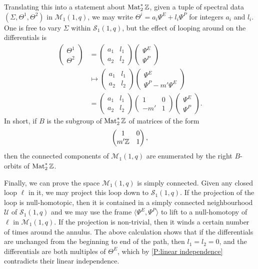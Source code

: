 Translating this into a statement about $\Mat_2^*\Z$, given a tuple of spectral data $(Σ,Θ^1,Θ^2)$ in $\mathcal{M}_1(1,q)$, we may write $Θ^i = a_i Ψ^E + l_i Ψ^P$ for integers $a_i$ and $l_i$. One is free to vary $Σ$ within $\mathcal{S}_1(1,q)$, but the effect of looping around on the differentials is
\begin{align*}
\begin{pmatrix}
Θ^1 \\ Θ^2
\end{pmatrix}
&=
\begin{pmatrix}
a_1 & l_1 \\
a_2 & l_2
\end{pmatrix}
\begin{pmatrix}
Ψ^E \\ Ψ^P
\end{pmatrix} \\
&\mapsto
\begin{pmatrix}
a_1 & l_1 \\
a_2 & l_2
\end{pmatrix}
\begin{pmatrix}
    Ψ^E \\ Ψ^P - m' Ψ^E
    \end{pmatrix} \\
&=
\begin{pmatrix}
a_1 & l_1 \\
a_2 & l_2
\end{pmatrix}
\begin{pmatrix}
    1 & 0 \\
    -m' & 1
\end{pmatrix}
\begin{pmatrix}
    Ψ^E \\ Ψ^P
    \end{pmatrix}.
\end{align*}
In short, if $B$ is the subgroup of $\Mat_2^*\Z$ of matrices of the form
\[
\begin{pmatrix}
1 & 0 \\
m'\Z & 1
\end{pmatrix},
\]
then the connected components of $\mathcal{M}_1(1,q)$ are enumerated by the right $B$-orbits of $\Mat_2^*\Z$.

Finally, we can prove the space $\mathcal{M}_1(1,q)$ is simply connected. Given any closed loop $\ell$ in it, we may project this loop down to $\mathcal{S}_1(1,q)$. If the projection of the loop is null-homotopic, then it is contained in a simply connected neighbourhood $\mathcal{U}$ of $\mathcal{S}_1(1,q)$ and we may use the frame $\langle Ψ^E,Ψ^P \rangle$ to lift to a null-homotopy of $\ell$ in $\mathcal{M}_1(1,q)$. If the projection is non-trivial, then it winds a certain number of times around the annulus. The above calculation shows that if the differentials are unchanged from the beginning to end of the path, then $l_1=l_2 = 0$, and the differentials are both multiples of $Θ^E$, which by \ref{P:linear independence} contradicts their linear independence.

